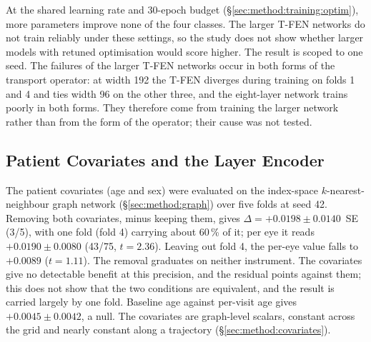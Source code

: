 At the shared learning rate and 30-epoch budget
(\S\ref{sec:method:training:optim}), more parameters improve none of the
four classes. The larger T-FEN networks do not train reliably under these
settings, so the study does not show whether larger models with retuned
optimisation would score higher. The result is scoped to one seed. The
failures of the
larger T-FEN networks occur in both forms of the transport operator: at
width 192 the T-FEN diverges during training on folds 1 and 4 and ties
width 96 on the other three, and the eight-layer network trains poorly in
both forms. They therefore come from training the larger
network rather than from the form of the operator; their cause was not
tested.

\iffalse
\subsection{Patient Covariates and the Layer Encoder}
\label{sec:experiments:ablations:conditioning}

The patient covariates (age and sex) were evaluated on the index-space
$k$-nearest-neighbour graph network (\S\ref{sec:method:graph}) over five
folds at seed 42. Removing both covariates, minus keeping them, gives
$\Delta = +0.0198 \pm 0.0140$~SE (3/5), with one fold (fold 4) carrying
about 60\,\% of it; per eye it reads $+0.0190 \pm 0.0080$ (43/75,
$t = 2.36$). Leaving out fold 4, the per-eye value falls to $+0.0089$
($t = 1.11$). The removal graduates on neither instrument. The covariates
give no detectable benefit at this precision, and the residual points
against them; this does not show that the two conditions are equivalent,
and the result is carried largely by one fold. Baseline age against
per-visit age gives $+0.0045 \pm 0.0042$, a null. The covariates are
graph-level scalars, constant across the grid and nearly constant along a
trajectory (\S\ref{sec:method:covariates}).

